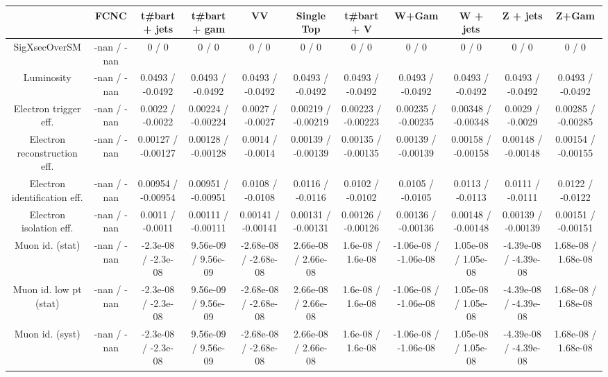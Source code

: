 \begin{table}[htbp]
\begin{center}
\footnotesize
\begin{tabular}{|c|c|c|c|c|c|c|c|c|c|c|}
\hline 
      & FCNC      & t#bar{t} + jets      & t#bar{t} +  gam      & VV      & Single Top      & t#bar{t} + V      & W+Gam      & W + jets      & Z + jets      & Z+Gam \\ 
\hline 
 SigXsecOverSM & -nan / -nan & 0 / 0 & 0 / 0 & 0 / 0 & 0 / 0 & 0 / 0 & 0 / 0 & 0 / 0 & 0 / 0 & 0 / 0 \\ 
  Luminosity & -nan / -nan & 0.0493 / -0.0492 & 0.0493 / -0.0492 & 0.0493 / -0.0492 & 0.0493 / -0.0492 & 0.0493 / -0.0492 & 0.0493 / -0.0492 & 0.0493 / -0.0492 & 0.0493 / -0.0492 & 0.0493 / -0.0492 \\ 
  Electron trigger eff. & -nan / -nan & 0.0022 / -0.0022 & 0.00224 / -0.00224 & 0.0027 / -0.0027 & 0.00219 / -0.00219 & 0.00223 / -0.00223 & 0.00235 / -0.00235 & 0.00348 / -0.00348 & 0.0029 / -0.0029 & 0.00285 / -0.00285 \\ 
  Electron reconstruction eff. & -nan / -nan & 0.00127 / -0.00127 & 0.00128 / -0.00128 & 0.0014 / -0.0014 & 0.00139 / -0.00139 & 0.00135 / -0.00135 & 0.00139 / -0.00139 & 0.00158 / -0.00158 & 0.00148 / -0.00148 & 0.00154 / -0.00155 \\ 
  Electron identification eff. & -nan / -nan & 0.00954 / -0.00954 & 0.00951 / -0.00951 & 0.0108 / -0.0108 & 0.0116 / -0.0116 & 0.0102 / -0.0102 & 0.0105 / -0.0105 & 0.0113 / -0.0113 & 0.0111 / -0.0111 & 0.0122 / -0.0122 \\ 
  Electron isolation eff. & -nan / -nan & 0.0011 / -0.0011 & 0.00111 / -0.00111 & 0.00141 / -0.00141 & 0.00131 / -0.00131 & 0.00126 / -0.00126 & 0.00136 / -0.00136 & 0.00148 / -0.00148 & 0.00139 / -0.00139 & 0.00151 / -0.00151 \\ 
  Muon id. (stat) & -nan / -nan & -2.3e-08 / -2.3e-08 & 9.56e-09 / 9.56e-09 & -2.68e-08 / -2.68e-08 & 2.66e-08 / 2.66e-08 & 1.6e-08 / 1.6e-08 & -1.06e-08 / -1.06e-08 & 1.05e-08 / 1.05e-08 & -4.39e-08 / -4.39e-08 & 1.68e-08 / 1.68e-08 \\ 
  Muon id. low pt (stat) & -nan / -nan & -2.3e-08 / -2.3e-08 & 9.56e-09 / 9.56e-09 & -2.68e-08 / -2.68e-08 & 2.66e-08 / 2.66e-08 & 1.6e-08 / 1.6e-08 & -1.06e-08 / -1.06e-08 & 1.05e-08 / 1.05e-08 & -4.39e-08 / -4.39e-08 & 1.68e-08 / 1.68e-08 \\ 
  Muon id. (syst) & -nan / -nan & -2.3e-08 / -2.3e-08 & 9.56e-09 / 9.56e-09 & -2.68e-08 / -2.68e-08 & 2.66e-08 / 2.66e-08 & 1.6e-08 / 1.6e-08 & -1.06e-08 / -1.06e-08 & 1.05e-08 / 1.05e-08 & -4.39e-08 / -4.39e-08 & 1.68e-08 / 1.68e-08 \\ 

\end{tabular}
\end{center}
\end{table}
